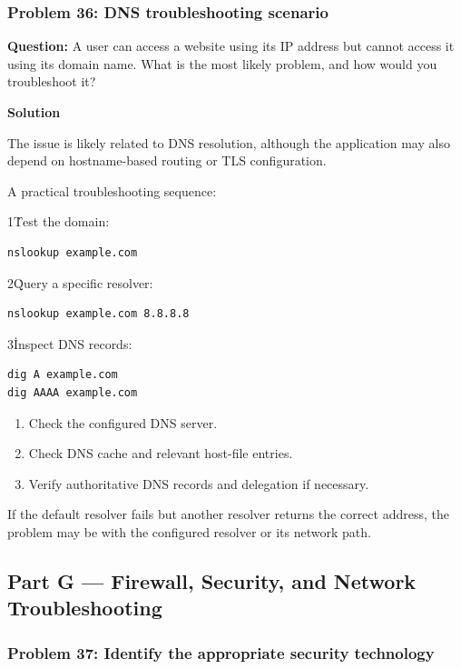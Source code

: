 \subsubsection*{Problem 36: DNS troubleshooting scenario}

\textbf{Question:} A user can access a website using its IP address but cannot access it using its domain name. What is the most likely problem, and how would you troubleshoot it?

\textbf{Solution}

The issue is likely related to DNS resolution, although the application may also depend on hostname-based routing or TLS configuration.

A practical troubleshooting sequence:

1\. Test the domain:

\begin{lstlisting}
nslookup example.com
\end{lstlisting}

2\. Query a specific resolver:

\begin{lstlisting}
nslookup example.com 8.8.8.8
\end{lstlisting}

3\. Inspect DNS records:

\begin{lstlisting}
dig A example.com
dig AAAA example.com
\end{lstlisting}

\begin{enumerate}
\item Check the configured DNS server.
\item Check DNS cache and relevant host-file entries.
\item Verify authoritative DNS records and delegation if necessary.
\end{enumerate}

If the default resolver fails but another resolver returns the correct address, the problem may be with the configured resolver or its network path.

\subsection{Part G --- Firewall, Security, and Network Troubleshooting}
\subsubsection*{Problem 37: Identify the appropriate security technology}

